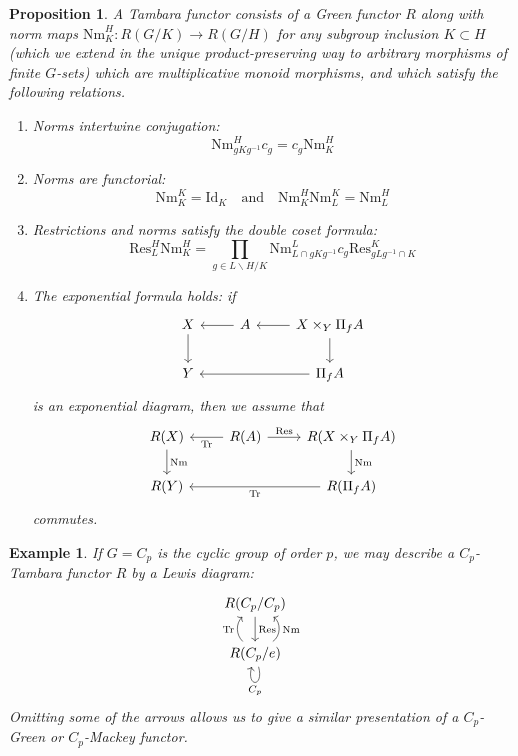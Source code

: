 \documentclass[11pt,dvipsnames]{amsart}
\newtheorem{proposition}[theorem]{Proposition}
\theoremstyle{BoldRemark}
\newtheorem{example}[theorem]{Example}
\begin{document}
\begin{proposition}
	A Tambara functor consists of a Green functor $R$ along with norm maps $\mathrm{Nm}_K^H : R(G/K) \rightarrow R(G/H)$ for any subgroup inclusion $K \subset H$ (which we extend in the unique product-preserving way to arbitrary morphisms of finite $G$-sets) which are multiplicative monoid morphisms, and which satisfy the following relations.
	\begin{enumerate}
		\item Norms intertwine conjugation: \[ \mathrm{Nm}_{gKg^{-1}}^H c_g = c_g \mathrm{Nm}_K^H \]
		\item Norms are functorial: \[ \mathrm{Nm}_K^K = \mathrm{Id}_K \quad \textrm{and} \quad \mathrm{Nm}_K^H \mathrm{Nm}_L^K = \mathrm{Nm}_L^H \]	
		\item Restrictions and norms satisfy the double coset formula:
		\[ \mathrm{Res}_L^H \mathrm{Nm}_K^H = \prod_{g \in L \backslash H / K} \mathrm{Nm}_{L \cap gKg^{-1}}^L c_g \mathrm{Res}_{gLg^{-1} \cap K}^K \]
		\item The exponential formula holds: if 
        \[ \begin{tikzcd}
            X \arrow[d] & A \arrow[l] & X \times_Y \Pi_f A \arrow[l] \arrow[d] \\ 
            Y & & \Pi_f A \arrow[ll] 
        \end{tikzcd} \] 
        is an exponential diagram, then we assume that
        \[ \begin{tikzcd}
            R(X) \arrow[d, "\mathrm{Nm}"] & R(A) \arrow[l, "\mathrm{Tr}"] \arrow[r, "\mathrm{Res}"] & R(X \times_Y \Pi_f A) \arrow[d, "\mathrm{Nm}"] \\
            R(Y) & & R(\Pi_f A) \arrow[ll, "\mathrm{Tr}"]
        \end{tikzcd} \] 
        commutes.
	\end{enumerate}
\end{proposition}

\begin{example}
	If $G = C_p$ is the cyclic group of order $p$, we may describe a $C_p$-Tambara functor $R$ by a \emph{Lewis diagram}:
    \[ \begin{tikzcd}
        R(C_p/C_p) \arrow[d, "\mathrm{Res}"] \\
        R(C_p/e) \arrow[u, bend left = 45, "\mathrm{Tr}"] \arrow[u, bend right = 55, swap, "\mathrm{Nm}"] \arrow[loop below, "C_p"]
    \end{tikzcd} \]
Omitting some of the arrows allows us to give a similar presentation of a $C_p$-Green or $C_p$-Mackey functor.
\end{example}
\end{document}
